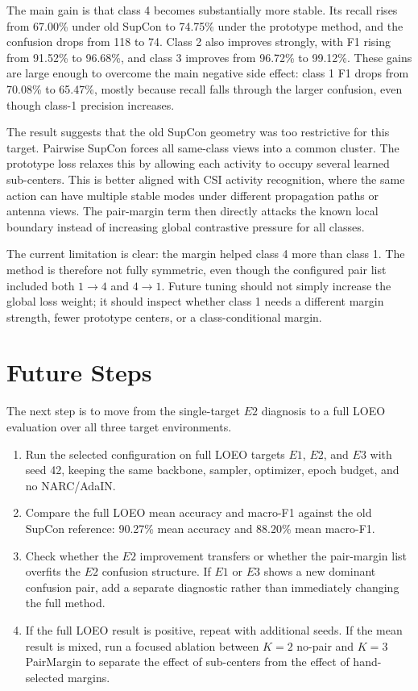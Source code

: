 \documentclass[11pt]{article}
\newcommand{\code}[1]{\texttt{\detokenize{#1}}}
\begin{document}
The main gain is that class 4 becomes substantially more stable. Its recall rises from 67.00\% under old SupCon to 74.75\% under the prototype method, and the \code{4 -> 1} confusion drops from 118 to 74. Class 2 also improves strongly, with F1 rising from 91.52\% to 96.68\%, and class 3 improves from 96.72\% to 99.12\%. These gains are large enough to overcome the main negative side effect: class 1 F1 drops from 70.08\% to 65.47\%, mostly because recall falls through the larger \code{1 -> 4} confusion, even though class-1 precision increases.

The result suggests that the old SupCon geometry was too restrictive for this target. Pairwise SupCon forces all same-class views into a common cluster. The prototype loss relaxes this by allowing each activity to occupy several learned sub-centers. This is better aligned with CSI activity recognition, where the same action can have multiple stable modes under different propagation paths or antenna views. The pair-margin term then directly attacks the known local boundary instead of increasing global contrastive pressure for all classes.

The current limitation is clear: the margin helped class 4 more than class 1. The method is therefore not fully symmetric, even though the configured pair list included both $1{\rightarrow}4$ and $4{\rightarrow}1$. Future tuning should not simply increase the global loss weight; it should inspect whether class 1 needs a different margin strength, fewer prototype centers, or a class-conditional margin.

\section{Future Steps}

The next step is to move from the single-target $E2$ diagnosis to a full LOEO evaluation over all three target environments.

\begin{enumerate}[leftmargin=*]
    \item Run the selected \code{K=3 + PairMargin} configuration on full LOEO targets $E1$, $E2$, and $E3$ with seed 42, keeping the same backbone, sampler, optimizer, epoch budget, and no NARC/AdaIN.
    \item Compare the full LOEO mean accuracy and macro-F1 against the old SupCon reference: 90.27\% mean accuracy and 88.20\% mean macro-F1.
    \item Check whether the $E2$ improvement transfers or whether the pair-margin list overfits the $E2$ confusion structure. If $E1$ or $E3$ shows a new dominant confusion pair, add a separate diagnostic rather than immediately changing the full method.
    \item If the full LOEO result is positive, repeat with additional seeds. If the mean result is mixed, run a focused ablation between $K=2$ no-pair and $K=3$ PairMargin to separate the effect of sub-centers from the effect of hand-selected margins.
\end{enumerate}
\end{document}
